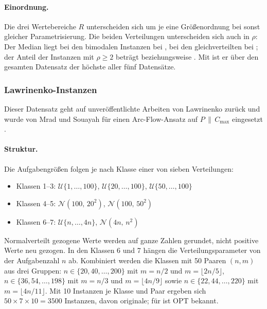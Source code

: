 \paragraph{Einordnung.}
Die drei Wertebereiche $R$ unterscheiden sich um je eine Größenordnung bei sonst gleicher
Parametrisierung.
Die beiden Verteilungen unterscheiden sich auch in $\rho$: Der Median liegt bei den
bimodalen Instanzen bei \EvalRhoMedianFrangioniBimodal, bei den gleichverteilten bei
\EvalRhoMedianFrangioniGleich; der Anteil der Instanzen mit $\rho \ge 2$ beträgt
\EvalRhoZweiAnteilFrangioniBimodal{} beziehungsweise \EvalRhoZweiAnteilFrangioniGleich.
Mit \EvalRhoZweiAnteilFrangioni{} ist er über den gesamten Datensatz der höchste aller fünf
Datensätze.

\subsubsection{Lawrinenko-Instanzen}
\label{sub:bench-lawrinenko}

Dieser Datensatz geht auf unveröffentlichte Arbeiten von Lawrinenko zurück \cite{akram2025} und
wurde von Mrad und Souayah für einen Arc-Flow-Ansatz auf $P\,\|\,C_{\max}$ eingesetzt
\cite{mrad2018}.

\paragraph{Struktur.}
Die Aufgabengrößen folgen je nach Klasse einer von sieben Verteilungen:
\begin{itemize}[nosep]
  \item Klassen 1--3: $\mathcal{U}\{1,\ldots,100\}$, $\mathcal{U}\{20,\ldots,100\}$,
    $\mathcal{U}\{50,\ldots,100\}$
  \item Klassen 4--5: $\mathcal{N}(100,\,20^2)$, $\mathcal{N}(100,\,50^2)$
  \item Klassen 6--7: $\mathcal{U}\{n,\ldots,4n\}$, $\mathcal{N}(4n,\,n^2)$
\end{itemize}
Normalverteilt gezogene Werte werden auf ganze Zahlen gerundet, nicht positive Werte neu gezogen.
In den Klassen 6 und 7 hängen die Verteilungsparameter von der Aufgabenzahl $n$ ab.
Kombiniert werden die Klassen mit 50 Paaren $(n,m)$ aus drei Gruppen:
$n \in \{20, 40, \ldots, 200\}$ mit $m = n/2$ und $m = \lfloor 2n/5 \rfloor$,
$n \in \{36, 54, \ldots, 198\}$ mit $m = n/3$ und $m = \lfloor 4n/9 \rfloor$ sowie
$n \in \{22, 44, \ldots, 220\}$ mit $m = \lfloor 4n/11 \rfloor$.
Mit 10 Instanzen je Klasse und Paar ergeben sich $50 \times 7 \times 10 = 3500$ Instanzen, davon
\EvalInstanzenLawrinenko{} originale; für \EvalOptBekanntLawrinenko{} ist OPT bekannt.

